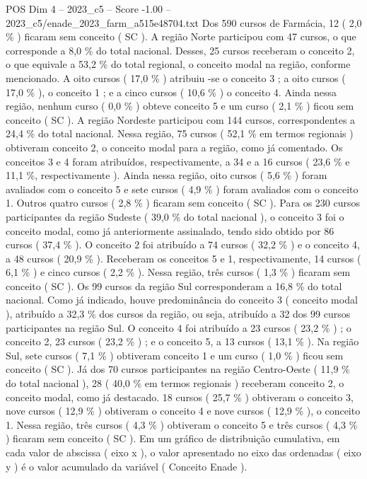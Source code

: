 \begin{textsample}{POS Dim 4 – 2023\_c5 – Score -1.00 – 2023\_c5/enade\_2023\_farm\_a515e48704.txt}
Dos 590 cursos de Farmácia, 12 ( 2,0 \% ) ficaram sem conceito ( SC ).
A região Norte participou com 47 cursos, o que corresponde a 8,0 \% do total nacional.
Desses, 25 cursos receberam o conceito 2, o que equivale a 53,2 \% do total regional, o conceito modal na região, conforme mencionado.
A oito cursos ( 17,0 \% ) atribuiu -se o conceito 3 ; a oito cursos ( 17,0 \% ), o conceito 1 ; e a cinco cursos ( 10,6 \% ) o conceito 4.
Ainda nessa região, nenhum curso ( 0,0 \% ) obteve conceito 5 e um curso ( 2,1 \% ) ficou sem conceito ( SC ).
A região Nordeste participou com 144 cursos, correspondentes a 24,4 \% do total nacional.
Nessa região, 75 cursos ( 52,1 \% em termos regionais ) obtiveram conceito 2, o conceito modal para a região, como já comentado.
Os conceitos 3 e 4 foram atribuídos, respectivamente, a 34 e a 16 cursos ( 23,6 \% e 11,1 \%, respectivamente ).
Ainda nessa região, oito cursos ( 5,6 \% ) foram avaliados com o conceito 5 e sete cursos ( 4,9 \% ) foram avaliados com o conceito 1.
Outros quatro cursos ( 2,8 \% ) ficaram sem conceito ( SC ).
Para os 230 cursos participantes da região Sudeste ( 39,0 \% do total nacional ), o conceito 3 foi o conceito modal, como já anteriormente assinalado, tendo sido obtido por 86 cursos ( 37,4 \% ).
O conceito 2 foi atribuído a 74 cursos ( 32,2 \% ) e o conceito 4, a 48 cursos ( 20,9 \% ).
Receberam os conceitos 5 e 1, respectivamente, 14 cursos ( 6,1 \% ) e cinco cursos ( 2,2 \% ).
Nessa região, três cursos ( 1,3 \% ) ficaram sem conceito ( SC ).
Os 99 cursos da região Sul corresponderam a 16,8 \% do total nacional.
Como já indicado, houve predominância do conceito 3 ( conceito modal ), atribuído a 32,3 \% dos cursos da região, ou seja, atribuído a 32 dos 99 cursos participantes na região Sul.
O conceito 4 foi atribuído a 23 cursos ( 23,2 \% ) ; o conceito 2, 23 cursos ( 23,2 \% ) ; e o conceito 5, a 13 cursos ( 13,1 \% ).
Na região Sul, sete cursos ( 7,1 \% ) obtiveram conceito 1 e um curso ( 1,0 \% ) ficou sem conceito ( SC ).
Já dos 70 cursos participantes na região Centro-Oeste ( 11,9 \% do total nacional ), 28 ( 40,0 \% em termos regionais ) receberam conceito 2, o conceito modal, como já destacado. 18 cursos ( 25,7 \% ) obtiveram o conceito 3, nove cursos ( 12,9 \% ) obtiveram o conceito 4 e nove cursos ( 12,9 \% ), o conceito 1.
Nessa região, três cursos ( 4,3 \% ) obtiveram o conceito 5 e três cursos ( 4,3 \% ) ficaram sem conceito ( SC ).
Em um gráfico de distribuição cumulativa, em cada valor de abscissa ( eixo x ), o valor apresentado no eixo das ordenadas ( eixo y ) é o valor acumulado da variável ( Conceito Enade ).

\end{textsample}
